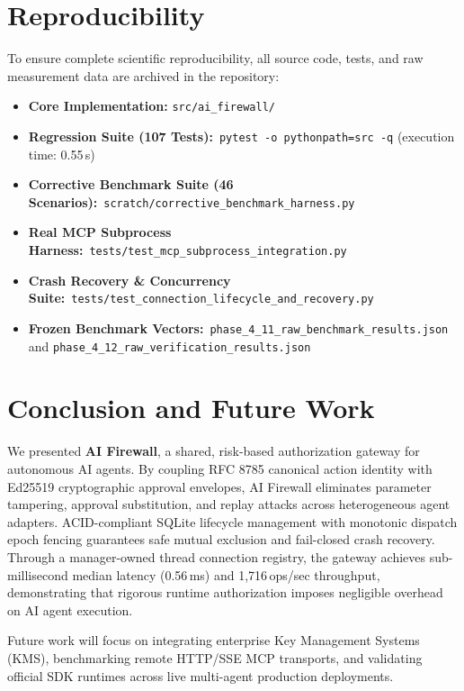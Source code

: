 \documentclass[sigconf,anonymous,review]{acmart}
\begin{document}
\section{Reproducibility}
To ensure complete scientific reproducibility, all source code, tests, and raw measurement data are archived in the repository:
\begin{itemize}
    \item \textbf{Core Implementation:} \texttt{src/ai\_firewall/}
    \item \textbf{Regression Suite (107 Tests):}\ \texttt{pytest -o pythonpath=src -q} (execution time: 0.55\,s)
    \item \textbf{Corrective Benchmark Suite (46 Scenarios):}\ \texttt{scratch/corrective\_benchmark\_harness.py}
    \item \textbf{Real MCP Subprocess Harness:}\ \texttt{tests/test\_mcp\_subprocess\_integration.py}
    \item \textbf{Crash Recovery \& Concurrency Suite:}\ \texttt{tests/test\_connection\_lifecycle\_and\_recovery.py}
    \item \textbf{Frozen Benchmark Vectors:}\ \texttt{phase\_4\_11\_raw\_benchmark\_results.json} and \texttt{phase\_4\_12\_raw\_verification\_results.json}
\end{itemize}

\section{Conclusion and Future Work}
We presented \textbf{AI Firewall}, a shared, risk-based authorization gateway for autonomous AI agents. By coupling RFC 8785 canonical action identity with Ed25519 cryptographic approval envelopes, AI Firewall eliminates parameter tampering, approval substitution, and replay attacks across heterogeneous agent adapters. ACID-compliant SQLite lifecycle management with monotonic dispatch epoch fencing guarantees safe mutual exclusion and fail-closed crash recovery. Through a manager-owned thread connection registry, the gateway achieves sub-millisecond median latency (0.56\,ms) and 1,716\,ops/sec throughput, demonstrating that rigorous runtime authorization imposes negligible overhead on AI agent execution.

Future work will focus on integrating enterprise Key Management Systems (KMS), benchmarking remote HTTP/SSE MCP transports, and validating official SDK runtimes across live multi-agent production deployments.



\end{document}
